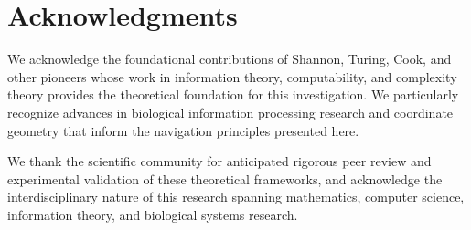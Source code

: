 \documentclass[11pt]{article}
\begin{document}
\section*{Acknowledgments}

We acknowledge the foundational contributions of Shannon, Turing, Cook, and other pioneers whose work in information theory, computability, and complexity theory provides the theoretical foundation for this investigation. We particularly recognize advances in biological information processing research and coordinate geometry that inform the navigation principles presented here.

We thank the scientific community for anticipated rigorous peer review and experimental validation of these theoretical frameworks, and acknowledge the interdisciplinary nature of this research spanning mathematics, computer science, information theory, and biological systems research.
\end{document}
